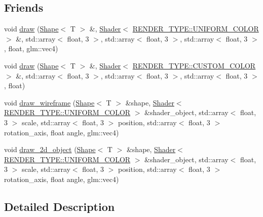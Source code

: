 \subsection*{Friends}
\begin{DoxyCompactItemize}
\item 
void \mbox{\hyperlink{classShape_a0f7d9c8330ae4f062c6f569a7400e1f0}{draw}} (\mbox{\hyperlink{classShape}{Shape}}$<$ T $>$ \&, \mbox{\hyperlink{classShader}{Shader}}$<$ \mbox{\hyperlink{render_8hpp_a24e288e18eb7b6e01de7565001fedb60aa98862073f71a928bad5099cc3e1c2ed}{R\+E\+N\+D\+E\+R\+\_\+\+T\+Y\+P\+E\+::\+U\+N\+I\+F\+O\+R\+M\+\_\+\+C\+O\+L\+OR}} $>$ \&, std\+::array$<$ float, 3 $>$, std\+::array$<$ float, 3 $>$, std\+::array$<$ float, 3 $>$, float, glm\+::vec4)
\item 
void \mbox{\hyperlink{classShape_a29e514c040e0781bfa2e08bcde4a7557}{draw}} (\mbox{\hyperlink{classShape}{Shape}}$<$ T $>$ \&, \mbox{\hyperlink{classShader}{Shader}}$<$ \mbox{\hyperlink{render_8hpp_a24e288e18eb7b6e01de7565001fedb60a9d34355b5a26c54b5dbab1e45245a6f4}{R\+E\+N\+D\+E\+R\+\_\+\+T\+Y\+P\+E\+::\+C\+U\+S\+T\+O\+M\+\_\+\+C\+O\+L\+OR}} $>$ \&, std\+::array$<$ float, 3 $>$, std\+::array$<$ float, 3 $>$, std\+::array$<$ float, 3 $>$, float)
\item 
void \mbox{\hyperlink{classShape_ad57e4dd441b60269c43114f31ffa6085}{draw\+\_\+wireframe}} (\mbox{\hyperlink{classShape}{Shape}}$<$ T $>$ \&shape, \mbox{\hyperlink{classShader}{Shader}}$<$ \mbox{\hyperlink{render_8hpp_a24e288e18eb7b6e01de7565001fedb60aa98862073f71a928bad5099cc3e1c2ed}{R\+E\+N\+D\+E\+R\+\_\+\+T\+Y\+P\+E\+::\+U\+N\+I\+F\+O\+R\+M\+\_\+\+C\+O\+L\+OR}} $>$ \&shader\+\_\+object, std\+::array$<$ float, 3 $>$ scale, std\+::array$<$ float, 3 $>$ position, std\+::array$<$ float, 3 $>$ rotation\+\_\+axis, float angle, glm\+::vec4)
\item 
void \mbox{\hyperlink{classShape_aaff31c90cf40c78284454009c9fe0966}{draw\+\_\+2d\+\_\+object}} (\mbox{\hyperlink{classShape}{Shape}}$<$ T $>$ \&shape, \mbox{\hyperlink{classShader}{Shader}}$<$ \mbox{\hyperlink{render_8hpp_a24e288e18eb7b6e01de7565001fedb60aa98862073f71a928bad5099cc3e1c2ed}{R\+E\+N\+D\+E\+R\+\_\+\+T\+Y\+P\+E\+::\+U\+N\+I\+F\+O\+R\+M\+\_\+\+C\+O\+L\+OR}} $>$ \&shader\+\_\+object, std\+::array$<$ float, 3 $>$ scale, std\+::array$<$ float, 3 $>$ position, std\+::array$<$ float, 3 $>$ rotation\+\_\+axis, float angle, glm\+::vec4)
\end{DoxyCompactItemize}


\subsection{Detailed Description}

